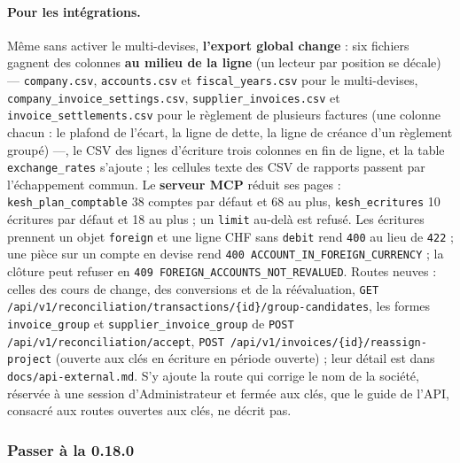 \documentclass[a4paper,11pt,oneside]{article}
\begin{document}
\begin{sloppypar}
\paragraph{Pour les intégrations.} Même sans activer le multi-devises, \textbf{l'export global change} : six fichiers gagnent des colonnes \textbf{au milieu de la ligne} (un lecteur par position se décale) --- \texttt{company.csv}, \texttt{accounts.csv} et \texttt{fiscal\_years.csv} pour le multi-devises, \texttt{company\_invoice\_settings.csv}, \texttt{supplier\_invoices.csv} et \texttt{invoice\_settlements.csv} pour le règlement de plusieurs factures (une colonne chacun : le plafond de l'écart, la ligne de dette, la ligne de créance d'un règlement groupé) ---, le CSV des lignes d'écriture trois colonnes en fin de ligne, et la table \texttt{exchange\_rates} s'ajoute ; les cellules texte des CSV de rapports passent par l'échappement commun. Le \textbf{serveur MCP} réduit ses pages : \texttt{kesh\_plan\_comptable} 38 comptes par défaut et 68 au plus, \texttt{kesh\_ecritures} 10 écritures par défaut et 18 au plus ; un \texttt{limit} au-delà est refusé. Les écritures prennent un objet \texttt{foreign} et une ligne CHF sans \texttt{debit} rend \texttt{400} au lieu de \texttt{422} ; une pièce sur un compte en devise rend \texttt{400 ACCOUNT\_IN\_FOREIGN\_CURRENCY} ; la clôture peut refuser en \texttt{409 FOREIGN\_ACCOUNTS\_NOT\_REVALUED}. Routes neuves : celles des cours de change, des conversions et de la réévaluation, \texttt{GET /api/v1/\allowbreak reconciliation/\allowbreak transactions/\allowbreak\{id\}/\allowbreak group-candidates}, les formes \texttt{invoice\_group} et \texttt{supplier\_invoice\_group} de \texttt{POST /api/v1/\allowbreak reconciliation/\allowbreak accept}, \texttt{POST /api/v1/\allowbreak invoices/\allowbreak\{id\}/\allowbreak reassign-project} (ouverte aux clés en écriture en période ouverte) ; leur détail est dans \texttt{docs/api-external.md}. S'y ajoute la route qui corrige le nom de la société, réservée à une session d'Administrateur et fermée aux clés, que le guide de l'API, consacré aux routes ouvertes aux clés, ne décrit pas.
\end{sloppypar}

\fussy

\subsubsection{Passer à la 0.18.0}\label{sec:maj-0-18-0}
\sloppy
\end{document}
